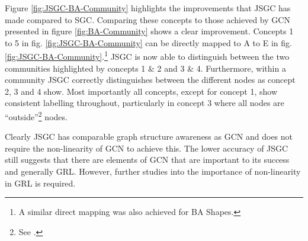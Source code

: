 
Figure \ref{fig:JSGC-BA-Community} highlights the improvements that JSGC has made compared to SGC.
Comparing these concepts to those achieved by GCN presented in figure \ref{fig:BA-Community} shows a clear improvement.
Concepts 1 to 5 in fig. \ref{fig:JSGC-BA-Community} can be directly mapped to A to E in fig. \ref{fig:JSGC-BA-Community}.\footnote{A similar direct mapping was also achieved for BA Shapes.}
JSGC is now able to distinguish between the two communities highlighted by concepts 1 \& 2 and 3 \& 4.
Furthermore, within a community JSGC correctly distinguishes between the different nodes as concept 2, 3 and 4 show.
Most importantly all concepts, except for concept 1, show consistent labelling throughout, particularly in concept 3 where all nodes are ``outside''\footnote{See .} nodes.

Clearly JSGC has comparable graph structure awareness as GCN and does not require the non-linearity of GCN to achieve this.
The lower accuracy of JSGC still suggests that there are elements of GCN that are important to its success and generally GRL.
However, further studies into the importance of non-linearity in GRL is required.
